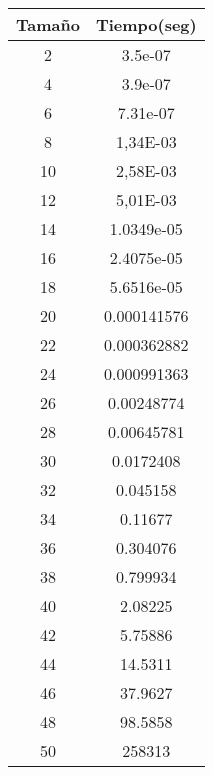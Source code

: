 \begin{longtable}{|c|c|}
\hline
\textbf{Tamaño} & \textbf{Tiempo(seg)} \\ \hline
2      & 3.5e-07     \\ \hline
4      & 3.9e-07     \\ \hline
6      & 7.31e-07    \\ \hline
8      & 1,34E-03    \\ \hline
10     & 2,58E-03    \\ \hline
12     & 5,01E-03    \\ \hline
14     & 1.0349e-05  \\ \hline
16     & 2.4075e-05  \\ \hline
18     & 5.6516e-05  \\ \hline
20     & 0.000141576 \\ \hline
22     & 0.000362882 \\ \hline
24     & 0.000991363 \\ \hline
26     & 0.00248774  \\ \hline
28     & 0.00645781  \\ \hline
30     & 0.0172408   \\ \hline
32     & 0.045158    \\ \hline
34     & 0.11677     \\ \hline
36     & 0.304076    \\ \hline
38     & 0.799934    \\ \hline
40     & 2.08225     \\ \hline
42     & 5.75886     \\ \hline
44     & 14.5311     \\ \hline
46     & 37.9627     \\ \hline
48     & 98.5858     \\ \hline
50     & 258313      \\ \hline
\end{longtable}
